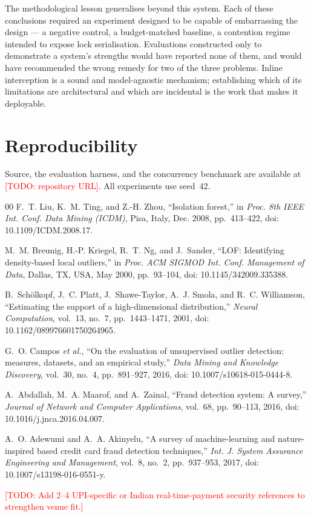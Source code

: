 \documentclass[journal]{IEEEtran}
\newcommand{\todo}[1]{\textcolor{red}{[TODO: #1]}}
\begin{document}
The methodological lesson generalises beyond this system. Each of these
conclusions required an experiment designed to be capable of embarrassing
the design --- a negative control, a budget-matched baseline, a contention
regime intended to expose lock serialisation. Evaluations constructed only
to demonstrate a system's strengths would have reported none of them, and
would have recommended the wrong remedy for two of the three problems.
Inline interception is a sound and model-agnostic mechanism; establishing
which of its limitations are architectural and which are incidental is the
work that makes it deployable.

\section*{Reproducibility}

Source, the evaluation harness, and the concurrency benchmark are available
at \todo{repository URL}. All experiments use seed~42.

\begin{thebibliography}{00}
 F.~T. Liu, K.~M. Ting, and Z.-H. Zhou, ``Isolation
forest,'' in \emph{Proc. 8th IEEE Int. Conf. Data Mining (ICDM)}, Pisa,
Italy, Dec. 2008, pp.~413--422, doi: 10.1109/ICDM.2008.17.

 M.~M. Breunig, H.-P. Kriegel, R.~T. Ng, and
J.~Sander, ``LOF: Identifying density-based local outliers,'' in \emph{Proc.
ACM SIGMOD Int. Conf. Management of Data}, Dallas, TX, USA, May 2000,
pp.~93--104, doi: 10.1145/342009.335388.

 B.~Sch\"{o}lkopf, J.~C. Platt, J.~Shawe-Taylor,
A.~J. Smola, and R.~C. Williamson, ``Estimating the support of a
high-dimensional distribution,'' \emph{Neural Computation}, vol.~13,
no.~7, pp.~1443--1471, 2001, doi: 10.1162/089976601750264965.

 G.~O. Campos \emph{et al.}, ``On the evaluation of
unsupervised outlier detection: measures, datasets, and an empirical
study,'' \emph{Data Mining and Knowledge Discovery}, vol.~30, no.~4,
pp.~891--927, 2016, doi: 10.1007/s10618-015-0444-8.

 A.~Abdallah, M.~A. Maarof, and A.~Zainal, ``Fraud
detection system: A survey,'' \emph{Journal of Network and Computer
Applications}, vol.~68, pp.~90--113, 2016,
doi: 10.1016/j.jnca.2016.04.007.

 A.~O. Adewumi and A.~A. Akinyelu, ``A survey of
machine-learning and nature-inspired based credit card fraud detection
techniques,'' \emph{Int. J. System Assurance Engineering and Management},
vol.~8, no.~2, pp.~937--953, 2017, doi: 10.1007/s13198-016-0551-y.

\todo{Add 2--4 UPI-specific or Indian real-time-payment security
references to strengthen venue fit.}
\end{thebibliography}
\end{document}
